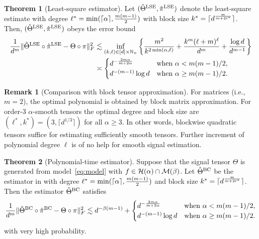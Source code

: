 \documentclass[11pt]{article}
\theoremstyle{definition}
\newtheorem{thm}{Theorem}
\newtheorem{rmk}{Remark}
\begin{document}
\begin{thm}[Least-square estimator]\label{thm:3} Let $(\hat \Theta^\textup{LSE}, \hat \pi^\textup{LSE})$ denote the least-square estimate with degree $\ell^*= \min(\lceil \alpha \rceil, {m(m-1)\over 2})$ with block size $k^*=\lceil  d^{m\over m+2\ell^*} \rceil $. Then, $(\hat \Theta^\textup{LSE}, \hat \pi^\textup{LSE})$ obeys the error bound
\begin{equation}
\begin{aligned}
{1\over d^m}\lVert\hat \Theta^\textup{LSE}\circ \hat \pi^\textup{LSE} -\Theta\circ \pi\rVert_F^2&\lesssim 
\inf_{(k,\ell)\in[d]\times \mathbb{N}_{+}}\left\{{m^2\over k^{2\min(\alpha,\ell)}}+{k^m(\ell+m)^\ell \over d^{m}}+{\log d\over d^{m-1}}\right\}\notag \\
&\asymp
\begin{cases}
d^{-{2m\alpha \over m+2\alpha}} & \text{when }\alpha<m(m-1)/2,\\
 d^{-(m-1)}\log d & \text{when }\alpha\geq m(m-1)/2.\\
\end{cases}
\end{aligned}
\end{equation}
\end{thm}
\begin{rmk}[Comparison with block tensor approximation] 
For matrices (i.e., $m=2$), the optimal polynomial is obtained by block matrix approximation. For order-3 $\alpha$-smooth tensors the optimal degree and block size are $(\ell^*, k^*)=(3,\lceil  d^{1/3}\rceil  )$ for all $\alpha\geq 3$. In other words, blockwise quadratic tensors suffice for estimating sufficiently smooth tensors. Further increment of polynomial degree $\ell$ is of no help for smooth signal estimation. 
\end{rmk}


\begin{thm}[Polynomial-time estimator] Suppose that the signal tensor $\Theta$ is generated from model~\eqref{eq:model} with $f\in \mathcal{H}(\alpha)\cap \mathcal{M}(\beta)$. Let $\hat \Theta^\textup{BC}$ be the estimator in with degree $\ell^*= \min(\lceil \alpha\rceil, {m(m-1)\over 2})$ and block size $k^*=\lceil d^{m\over m+2\ell^*}\rceil$. Then the estimator $\hat \Theta^\textup{BC} $ satisfies
\[
{1\over d^m}\lVert\hat \Theta^\textup{BC}\circ \hat \pi^\textup{BC} -\Theta\circ \pi\rVert_F^2\lesssim d^{-\beta(m-1)}+
\begin{cases}
d^{-{2m\alpha \over m+2\alpha}} & \text{when }\alpha < m(m-1)/2,\\
 d^{-(m-1)}\log d & \text{when }\alpha \geq m(m-1)/2.\\
\end{cases}
\]
with very high probability. 
\end{thm}
\end{document}
